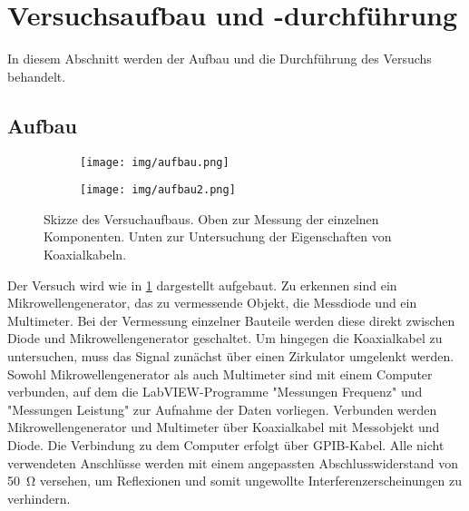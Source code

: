 \section{Versuchsaufbau und -durchführung} \label{sec:aufbau}

	In diesem Abschnitt werden der Aufbau und die Durchführung des Versuchs behandelt.

\subsection*{Aufbau}
	

	\begin{figure}[H]
		\centering
		\begin{subfigure}[c]{\textwidth}		
			\centering	
			\texttt{[image: img/aufbau.png]}
		\end{subfigure}
		
		\begin{subfigure}[c]{\textwidth}
			\centering
			\texttt{[image: img/aufbau2.png]}
		\end{subfigure}
		
		\caption{Skizze des Versuchaufbaus. 
			Oben zur Messung der einzelnen Komponenten. 
			Unten zur Untersuchung der Eigenschaften von Koaxialkabeln. \cite{wwu}}
		\label{fig:aufbau}
	\end{figure}

	Der Versuch wird wie in \cref{fig:aufbau} dargestellt aufgebaut.
	Zu erkennen sind ein Mikrowellengenerator, das zu vermessende Objekt, die Messdiode und ein Multimeter.
	Bei der Vermessung einzelner Bauteile werden diese direkt zwischen Diode und Mikrowellengenerator geschaltet.
	Um hingegen die Koaxialkabel zu untersuchen, muss das Signal zunächst über einen Zirkulator umgelenkt werden.
	Sowohl Mikrowellengenerator als auch Multimeter sind mit einem Computer verbunden, auf dem die LabVIEW-Programme "Messungen Frequenz" und "Messungen Leistung" zur Aufnahme der Daten vorliegen.
	Verbunden werden Mikrowellengenerator und Multimeter über Koaxialkabel mit Messobjekt und Diode.
	Die Verbindung zu dem Computer erfolgt über GPIB-Kabel.
	Alle nicht verwendeten Anschlüsse werden mit einem angepassten Abschlusswiderstand von \SI{50}{\ohm} versehen, um Reflexionen und somit ungewollte Interferenzerscheinungen zu verhindern.
	
